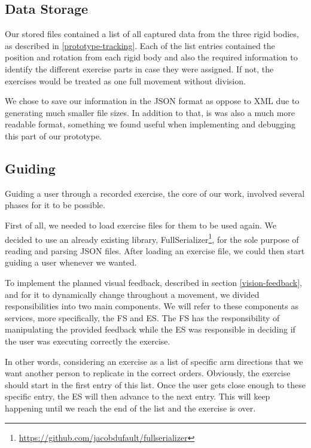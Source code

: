\subsection{Data Storage}

Our stored files contained a list of all captured data from the three rigid bodies, as described in \ref{prototype-tracking}. 
Each of the list entries contained the position and rotation from each rigid body and also the required information to identify the different exercise parts in case they were assigned. 
If not, the exercises would be treated as one full movement without division.

We chose to save our information in the JSON format as oppose to XML due to generating much smaller file sizes. In addition to that, is was also a much more readable format, something we found useful when implementing and debugging this part of our prototype.

\subsection{Guiding}


Guiding a user through a recorded exercise, the core of our work, involved several phases for it to be possible.

First of all, we needed to load exercise files for them to be used again. 
We decided to use an already existing library, FullSerializer\footnote{\url{https://github.com/jacobdufault/fullserializer}}, for the sole purpose of reading and parsing JSON files.
After loading an exercise file, we could then start guiding a user whenever we wanted.

To implement the planned visual feedback, described in section \ref{vision-feedback}, and for it to dynamically change throughout a movement, 
we divided responsibilities into two main components. We will refer to these components as services, more specifically, the \ac{FS} and \ac{ES}.
The \ac{FS} has the responsibility of manipulating the provided feedback while the \ac{ES} was responsible in deciding if the user was executing correctly the exercise.

In other words, considering an exercise as a list of specific arm directions that we want another person to replicate in the correct orders. 
Obviously, the exercise should start in the first entry of this list. 
Once the user gets close enough to these specific entry, the \ac{ES} will then advance to the next entry. 
This will keep happening until we reach the end of the list and the exercise is over.

